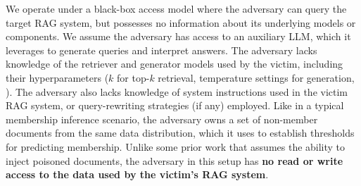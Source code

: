  We operate under a black-box access model where the adversary can query the target RAG system, but possesses no information about its underlying models or components. We assume the adversary has access to an auxiliary LLM, which it leverages to generate queries and interpret answers.
The adversary lacks knowledge of the retriever and generator models used by the victim, including their hyperparameters (\eg $k$ for top-$k$ retrieval, temperature settings for generation, \etc). The adversary also lacks knowledge of system instructions used in the victim RAG system, or query-rewriting strategies (if any) employed. Like in a typical membership inference scenario, the adversary owns a set of non-member documents from the same data distribution, which it uses to establish thresholds for predicting membership. Unlike some prior work \citep{chaudhari2024phantom} that assumes the ability to inject poisoned documents, the adversary in this setup has \textbf{no read or write access to the data used by the victim's RAG system}.



